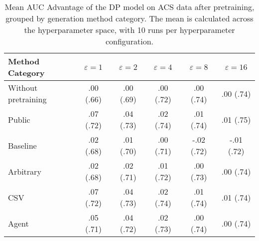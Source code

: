 \begin{table}[h!]
    \centering
    \caption{Mean AUC Advantage of the DP model on ACS data after pretraining, grouped by generation method category. The mean is calculated across the hyperparameter space, with 10 runs per hyperparameter configuration.}
    \label{tab:epsilon_comparison}
    \begin{tabular}{lccccc}
    \toprule
    Method Category & $\varepsilon=1$ & $\varepsilon=2$ & $\varepsilon=4$ & $\varepsilon=8$ & $\varepsilon=16$ \\
    \midrule
    Without pretraining & .00 {\small (.66)} & .00 {\small (.69)} & .00 {\small (.72)} & .00 {\small (.74)} & .00 {\small (.74)} \\
    \arrayrulecolor{black!50!}\midrule
    Public & \cellcolor{silver!30}.07 {\small (.72)} & \cellcolor{gold!30}.04 {\small (.73)} & \cellcolor{gold!30}.02 {\small (.74)} & \cellcolor{gold!30}.01 {\small (.74)} & \cellcolor{gold!30}.01 {\small (.75)} \\
    \arrayrulecolor{black!50!}\midrule
    Baseline & .02 {\small (.68)} & .01 {\small (.70)} & .00 {\small (.71)} & -.02 {\small (.72)} & -.01 {\small (.72)} \\
    \arrayrulecolor{black!50!}\midrule
    Arbitrary & .02 {\small (.68)} & \cellcolor{bronze!30}.02 {\small (.71)} & .01 {\small (.72)} & .00 {\small (.73)} & .00 {\small (.74)} \\
    \arrayrulecolor{black!50!}\midrule
    CSV & \cellcolor{gold!30}.07 {\small (.72)} & \cellcolor{gold!30}.04 {\small (.73)} & \cellcolor{silver!30}.02 {\small (.74)} & \cellcolor{silver!30}.01 {\small (.74)} & \cellcolor{silver!30}.01 {\small (.74)} \\
    Agent & \cellcolor{bronze!30}.05 {\small (.71)} & \cellcolor{silver!30}.04 {\small (.72)} & \cellcolor{bronze!30}.02 {\small (.73)} & \cellcolor{bronze!30}.00 {\small (.74)} & \cellcolor{bronze!30}.00 {\small (.74)} \\
    \bottomrule
    \end{tabular}
\end{table}